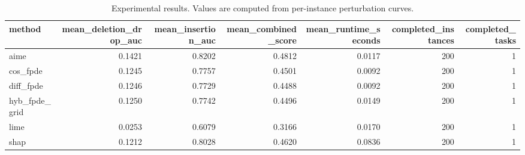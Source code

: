 \begin{table}[t]
\caption{Experimental results. Values are computed from per-instance perturbation curves.}
\label{tab:main_results_computed}
\centering
\begin{tabular}{lrrrrrr}
\toprule
method & mean\_deletion\_drop\_auc & mean\_insertion\_auc & mean\_combined\_score & mean\_runtime\_seconds & completed\_instances & completed\_tasks \\
\midrule
aime & 0.1421 & 0.8202 & 0.4812 & 0.0117 & 200 & 1 \\
cos\_fpde & 0.1245 & 0.7757 & 0.4501 & 0.0092 & 200 & 1 \\
diff\_fpde & 0.1246 & 0.7729 & 0.4488 & 0.0092 & 200 & 1 \\
hyb\_fpde\_grid & 0.1250 & 0.7742 & 0.4496 & 0.0149 & 200 & 1 \\
lime & 0.0253 & 0.6079 & 0.3166 & 0.0170 & 200 & 1 \\
shap & 0.1212 & 0.8028 & 0.4620 & 0.0836 & 200 & 1 \\
\bottomrule
\end{tabular}

\end{table}

